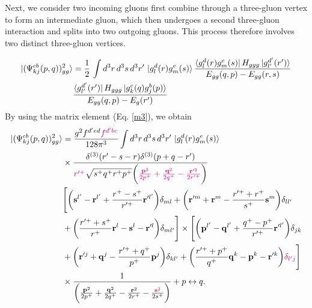 \documentclass[a4paper,11pt]{article}
\def\v#1{\mathbf{#1}}
\begin{document}
Next, we consider two incoming gluons first combine through a three-gluon vertex to form an intermediate gluon, which then undergoes a second three-gluon interaction and splits into two outgoing gluons. This process therefore involves two distinct three-gluon vertices.

\begin{figure}[htbp]
    \centering
\end{figure}
\begin{align}
     \ket{(\Psi^{cb}_{kj}(p,q))^{2}_{gg}} & = \frac{1}{2}\, \int d^{3}r\, d^{3}s\, d^{3}r^{\prime}\, \ket{g^{d}_{l}(r)g^{e}_{m}(s)} \frac{\bra{g^{d}_{l}(r)g^{e}_{m}(s)}H_{ggg}\ket{g^{d^{\prime}}_{l^{\prime}}(r^{\prime})}}{E_{gg}(q,p)-E_{gg}(r,s)}\notag \\ & \frac{\bra{g^{d^{\prime}}_{l^{\prime}}(r^{\prime})}H_{ggg}\ket{g^{c}_{k}(q)g^{b}_{j}(p)}}{E_{gg}(q,p)-E_{g}(r^{\prime})}
\end{align}
By using the matrix element (Eq. \eqref{m3}), we obtain
\begin{align}\label{eq:schan}
    \ket{(\Psi^{cb}_{kj}(p,q))^{2}_{gg}} & = \frac{g^{2}f^{d^{\prime}ed}{\color{chg}f^{d^{\prime}bc}}}{128\pi^{3}}\int d^{3}r\, d^{3}s\, d^{3}r^{\prime}\, \ket{g^{d}_{l}(r)g^{e}_{m}(s)}\notag \\ & \times\frac{\delta^{(3)}(r^{\prime}-s-r)\delta^{(3)}(p+q-r^{\prime})}{{\color{chg}r^{\prime +}}\sqrt{s^{+}q^{+}r^{+}p^{+}}\bigg({\color{chg}\frac{\v{p}^{2}}{2p^{+}}+\frac{\v{q}^{2}}{2q^{+}}-\frac{\v{r}^{\prime 2}}{2r^{\prime +}}}\bigg)}\notag \\ & \Bigg[\bigg(\v{s}^{l^{\prime}}-\v{r}^{l^{\prime}}+\frac{r^{+}-s^{+}}{r^{\prime +}}\v{r}^{\prime l^{\prime}}\bigg)\delta_{ml} + \bigg(\v{r}^{\prime m}+\v{r}^{m}-\frac{r^{\prime +}+r^{+}}{s^{+}}\v{s}^{m}\bigg)\delta_{ll^{\prime}}\notag \\ & +\bigg(\frac{r^{\prime +}+s^{+}}{r^{+}}\v{r}^{l}-\v{s}^{l}-\v{r}^{\prime l}\bigg)\delta_{ml^{\prime}}\Bigg] \times \Bigg[\bigg(\v{p}^{l^{\prime}}-\v{q}^{l^{\prime}}+\frac{q^{+}-p^{+}}{r^{\prime +}}\v{r}^{\prime l^{\prime}}\bigg)\delta_{jk} \notag \\ & +\bigg(\v{r}^{\prime j}+\v{q}^{j}-\frac{r^{\prime +}+q^{+}}{p^{+}}\v{p}^{j}\bigg)\delta_{kl^{\prime}} +\bigg(\frac{r^{\prime +}+p^{+}}{q^{+}}\v{q}^{k}-\v{p}^{k}-\v{r}^{\prime k}\bigg){\color{chg}\delta_{l^{\prime}j}}\Bigg]\notag \\ & \times \frac{1}{\bigg(\frac{\v{p}^{2}}{2p^{+}}+\frac{\v{q}^{2}}{2q^{+}}-\frac{\v{r}^{2}}{2r^{+}}-\frac{{\color{chg}\v{s}^{2}}}{2s^{+}}\bigg)} + p\leftrightarrow q.
\end{align}
\end{document}
